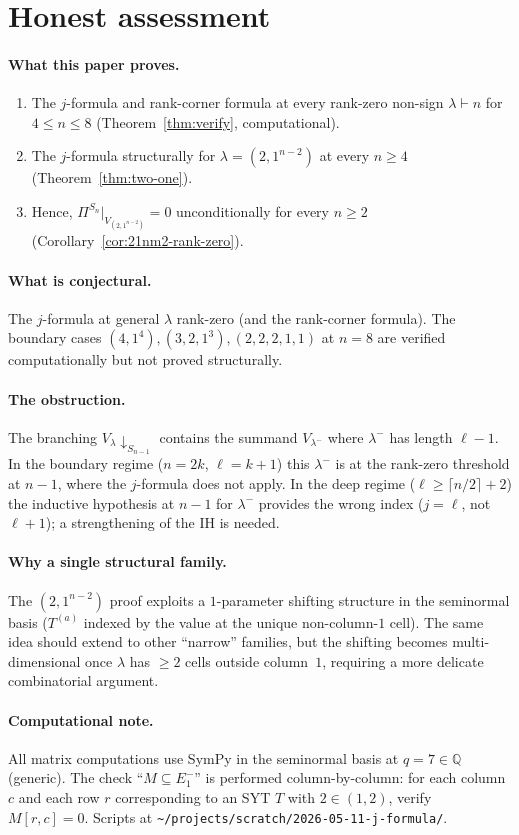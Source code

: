 \documentclass[11pt]{article}
\theoremstyle{definition}
\begin{document}
\section{Honest assessment}

\paragraph{What this paper proves.}
\begin{enumerate}[leftmargin=2em,topsep=0.3em,itemsep=0.2em]
\item The $j$-formula and rank-corner formula at every rank-zero
non-sign $\lambda\vdash n$ for $4\le n\le 8$
(Theorem~\ref{thm:verify}, computational).
\item The $j$-formula structurally for $\lambda=(2,1^{n-2})$ at every
$n\ge 4$ (Theorem~\ref{thm:two-one}).
\item Hence, $\Pi^{S_n}|_{V_{(2,1^{n-2})}}=0$ unconditionally for
every $n\ge 2$ (Corollary~\ref{cor:21nm2-rank-zero}).
\end{enumerate}

\paragraph{What is conjectural.}
The $j$-formula at general $\lambda$ rank-zero (and the rank-corner
formula).  The boundary cases $(4,1^4),(3,2,1^3),(2,2,2,1,1)$ at
$n=8$ are verified computationally but not proved structurally.

\paragraph{The obstruction.}  The branching $V_\lambda
{\downarrow}_{S_{n-1}}$ contains the summand $V_{\lambda^-}$ where
$\lambda^-$ has length $\ell-1$.  In the boundary regime ($n=2k$,
$\ell=k+1$) this $\lambda^-$ is at the rank-zero threshold at $n-1$,
where the $j$-formula does not apply.  In the deep regime
($\ell\ge\lceil n/2\rceil+2$) the inductive hypothesis at $n-1$ for
$\lambda^-$ provides the wrong index ($j=\ell$, not $\ell+1$); a
strengthening of the IH is needed.

\paragraph{Why a single structural family.}  The $(2,1^{n-2})$ proof
exploits a $1$-parameter shifting structure in the seminormal basis
($T^{(a)}$ indexed by the value at the unique non-column-$1$ cell).
The same idea should extend to other ``narrow'' families, but the
shifting becomes multi-dimensional once $\lambda$ has $\ge 2$ cells
outside column~$1$, requiring a more delicate combinatorial argument.

\paragraph{Computational note.}  All matrix computations use SymPy in
the seminormal basis at $q=7\in\mathbb{Q}$ (generic).  The check
``$M\subseteq E_1^-$'' is performed column-by-column: for each column
$c$ and each row $r$ corresponding to an SYT $T$ with $2\in(1,2)$,
verify $M[r,c]=0$.  Scripts at
\texttt{\textasciitilde/projects/scratch/2026-05-11-j-formula/}.
\end{document}
